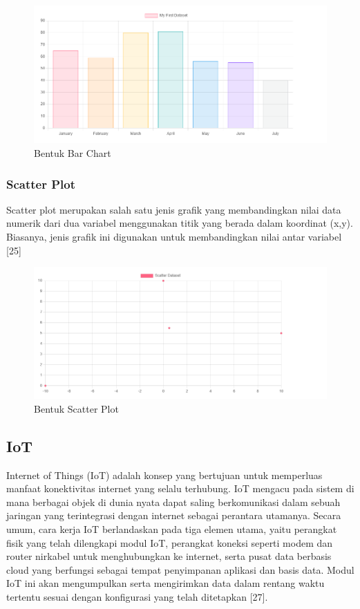 \begin{figure}[H]
	\centering
	\includegraphics[width=0.8\linewidth]{gambar/Dasar teori/Bar Chart.png}
	\caption{Bentuk Bar Chart}
	\label{gambar1}
\end{figure}

\subsubsection{Scatter Plot}
Scatter plot merupakan salah satu jenis grafik yang membandingkan nilai data numerik dari dua variabel menggunakan titik yang berada dalam koordinat (x,y). Biasanya, jenis grafik ini digunakan untuk membandingkan nilai antar variabel [25]

\begin{figure}[H]
	\centering
	\includegraphics[width=0.8\linewidth]{gambar/Dasar teori/scatter.png}
	\caption{Bentuk Scatter Plot}
	\label{gambar1}
\end{figure}

\subsection{IoT}
Internet of Things (IoT) adalah konsep yang bertujuan untuk memperluas manfaat konektivitas internet yang selalu terhubung. IoT mengacu pada sistem di mana berbagai objek di dunia nyata dapat saling berkomunikasi dalam sebuah jaringan yang terintegrasi dengan internet sebagai perantara utamanya. Secara umum, cara kerja IoT berlandaskan pada tiga elemen utama, yaitu perangkat fisik yang telah dilengkapi modul IoT, perangkat koneksi seperti modem dan router nirkabel untuk menghubungkan ke internet, serta pusat data berbasis cloud yang berfungsi sebagai tempat penyimpanan aplikasi dan basis data. Modul IoT ini akan mengumpulkan serta mengirimkan data dalam rentang waktu tertentu sesuai dengan konfigurasi yang telah ditetapkan [27].

